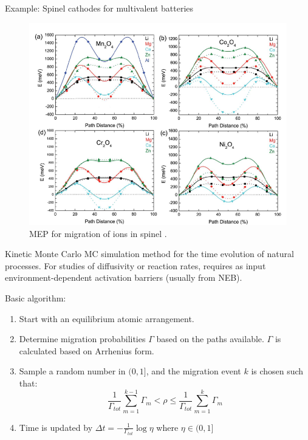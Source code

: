 \documentclass[aspectratio=169]{beamer}
\begin{document}
    \begin{frame}{Example: Spinel cathodes for multivalent batteries}
        \begin{figure}
            \centering
            \includegraphics[width=0.5\linewidth]{lectures/figures/12-Multivalent_Cathodes.png}
            \caption{MEP for migration of ions in spinel .\cite{liuSpinelCompoundsMultivalent2014}}
        \end{figure}
    \end{frame}

    \begin{frame}{Kinetic Monte Carlo}
        MC simulation method for the time evolution of natural processes. For studies of diffusivity or reaction rates, requires as input environment-dependent activation barriers (usually from NEB).

        Basic algorithm:
        \begin{enumerate}
            \item Start with an equilibrium atomic arrangement.
            \item Determine migration probabilities $\Gamma$ based on the paths available. $\Gamma$ is calculated based on Arrhenius form.
            \item Sample a random number in $(0,1]$, and the migration event $k$ is chosen such that:
            \begin{equation*}
                \frac{1}{\Gamma_{tot}} \sum_{m=1}^{k-1} \Gamma_m < \rho \leq \frac{1}{\Gamma_{tot}} \sum_{m=1}^{k} \Gamma_m
            \end{equation*}
            \item Time is updated by $\Delta t = - \frac{1}{\Gamma_{tot}} \log \eta$ where $\eta \in (0,1]$

        \end{enumerate}

    \end{frame}
\end{document}
